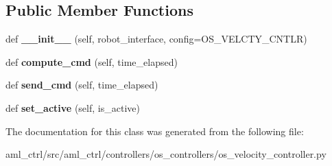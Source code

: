 \subsection*{Public Member Functions}
\begin{DoxyCompactItemize}
\item 
\hypertarget{classaml__ctrl_1_1controllers_1_1os__controllers_1_1os__velocity__controller_1_1_o_s_velocity_controller_af95131e5cd612a15c4f5a9401a26c246}{}\label{classaml__ctrl_1_1controllers_1_1os__controllers_1_1os__velocity__controller_1_1_o_s_velocity_controller_af95131e5cd612a15c4f5a9401a26c246} 
def {\bfseries \+\_\+\+\_\+init\+\_\+\+\_\+} (self, robot\+\_\+interface, config=O\+S\+\_\+\+V\+E\+L\+C\+T\+Y\+\_\+\+C\+N\+T\+LR)
\item 
\hypertarget{classaml__ctrl_1_1controllers_1_1os__controllers_1_1os__velocity__controller_1_1_o_s_velocity_controller_a6039fbb58a8cd9347100131295d6b9d0}{}\label{classaml__ctrl_1_1controllers_1_1os__controllers_1_1os__velocity__controller_1_1_o_s_velocity_controller_a6039fbb58a8cd9347100131295d6b9d0} 
def {\bfseries compute\+\_\+cmd} (self, time\+\_\+elapsed)
\item 
\hypertarget{classaml__ctrl_1_1controllers_1_1os__controllers_1_1os__velocity__controller_1_1_o_s_velocity_controller_ae6e985ff59041515d903edf179397581}{}\label{classaml__ctrl_1_1controllers_1_1os__controllers_1_1os__velocity__controller_1_1_o_s_velocity_controller_ae6e985ff59041515d903edf179397581} 
def {\bfseries send\+\_\+cmd} (self, time\+\_\+elapsed)
\item 
\hypertarget{classaml__ctrl_1_1controllers_1_1os__controllers_1_1os__velocity__controller_1_1_o_s_velocity_controller_a219ef55e5ad2a447eb14b3dba14de936}{}\label{classaml__ctrl_1_1controllers_1_1os__controllers_1_1os__velocity__controller_1_1_o_s_velocity_controller_a219ef55e5ad2a447eb14b3dba14de936} 
def {\bfseries set\+\_\+active} (self, is\+\_\+active)
\end{DoxyCompactItemize}


The documentation for this class was generated from the following file\+:\begin{DoxyCompactItemize}
\item 
aml\+\_\+ctrl/src/aml\+\_\+ctrl/controllers/os\+\_\+controllers/os\+\_\+velocity\+\_\+controller.\+py\end{DoxyCompactItemize}
